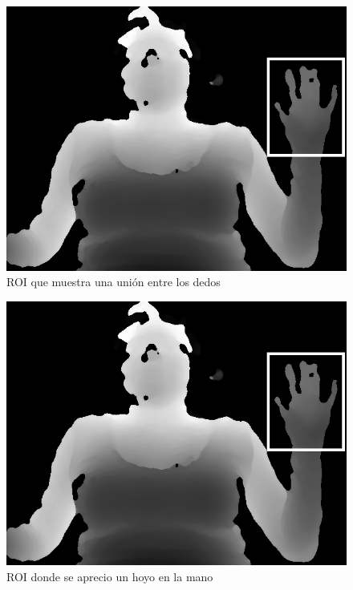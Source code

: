 \begin{figure}[h!]
\begin{center}
\includegraphics[scale=.5]{./Figures/roi.png}
\end{center}
\caption{ROI que muestra una unión entre los dedos}
\label{fig:RuidoUnion}
\end{figure}   

\begin{figure}[h!]
\begin{center}
\includegraphics[scale=.5]{./Figures/roi.png}
\end{center}
\caption{ROI donde se aprecio un hoyo en la mano}
\label{fig:RuidoHoyo}
\end{figure}  


